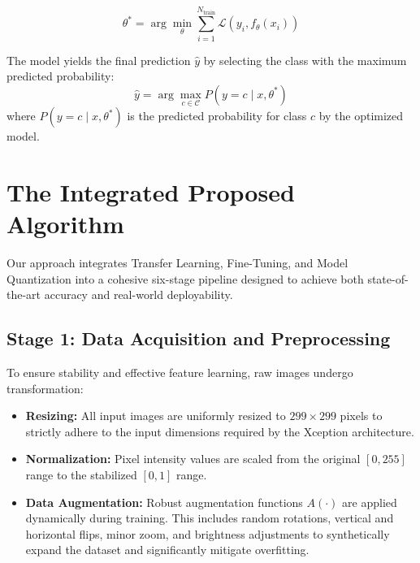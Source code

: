\documentclass[12pt, a4paper]{report}
\begin{document}
\begin{equation}
\theta^* = \arg \min_{\theta} \sum_{i=1}^{N_{\text{train}}} \mathcal{L}(y_i, f_{\theta}(x_i))
\end{equation}

The model yields the final prediction $\hat{y}$ by selecting the class with the maximum predicted probability:
\begin{equation}
\hat{y} = \arg \max_{c \in \mathcal{C}} P(y=c \mid x, \theta^*)
\end{equation}
where $P(y=c \mid x, \theta^*)$ is the predicted probability for class $c$ by the optimized model.

\section{The Integrated Proposed Algorithm}
\label{sec:proposed_algorithm}
\noindent %
Our approach integrates Transfer Learning, Fine-Tuning, and Model Quantization into a cohesive six-stage pipeline designed to achieve both state-of-the-art accuracy and real-world deployability.

\subsection{Stage 1: Data Acquisition and Preprocessing}
\label{sec:preprocessing}
\noindent %
To ensure stability and effective feature learning, raw images undergo transformation:
\begin{itemize}
    \item \textbf{Resizing:} All input images are uniformly resized to $299 \times 299$ pixels to strictly adhere to the input dimensions required by the Xception architecture.
    \item \textbf{Normalization:} Pixel intensity values are scaled from the original $[0, 255]$ range to the stabilized $[0, 1]$ range.
    \item \textbf{Data Augmentation:} Robust augmentation functions $A(\cdot)$ are applied dynamically during training. This includes random rotations, vertical and horizontal flips, minor zoom, and brightness adjustments to synthetically expand the dataset and significantly mitigate overfitting.
\end{itemize}
\end{document}
